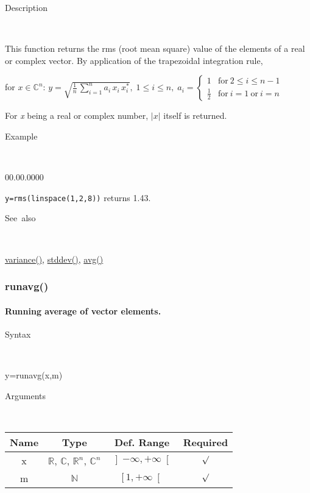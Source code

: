 \begin{description}
\item [Description]~
\end{description}
This function returns the rms (root mean square) value of the elements
of a real or complex vector. By application of the trapezoidal integration
rule,

\medskip{}
for $x\in$$\mathbb{C}^{n}$: $y=\sqrt{{\displaystyle \frac{1}{n}}\,\sum\limits _{i=1}^{n}a_{i}\, x_{i}\, x_{i}^{*}}$$,\;1\leq i\leq n,\; a_{i}=\left\{ \begin{array}{cc}
1 & \mathrm{for}\:2\leq i\leq n-1\\
\frac{1}{2} & \mathrm{for}\: i=1\:\mathrm{or}\: i=n\end{array}\right.$
\medskip{}

\noindent For \textit{x} being a real or complex number, \textit{$\left|x\right|$}
itself is returned.

\begin{description}
\item [Example]~
\end{description}
\begin{lyxlist}{00.00.0000}
\item [\texttt{y=rms(linspace(1,2,8))}]returns 1.43.
\end{lyxlist}
\begin{description}
\item [See~also]~
\end{description}
\textcolor{blue}{\hyperlink{variance}{variance()}}\textcolor{black}{,}
\textcolor{blue}{\hyperlink{stddev}{stddev()}}\textcolor{black}{,}
\textcolor{blue}{\hyperlink{avg}{avg()}}


\newpage
\subsubsection*{\hypertarget{runavg}{}{\Large runavg()}}


\paragraph{\label{par:Running-average}Running average of vector elements.}

\begin{description}
\item [Syntax]~
\end{description}
y=runavg(x,m)

\begin{description}
\item [Arguments]~
\end{description}
\begin{tabular}{|c|c|c|c|}
\hline 
Name&
Type&
Def. Range&
Required\tabularnewline
\hline
\hline 
x&
$\mathbb{R}$, $\mathbb{C}$, $\mathbb{R}^{n}$, $\mathbb{C}^{n}$&
$\left]-\infty,+\infty\right[$&
$\surd$\tabularnewline
\hline
m&
$\mathbb{N}$&
$\left[1,+\infty\right[$&
$\surd$\tabularnewline
\hline
\end{tabular}

